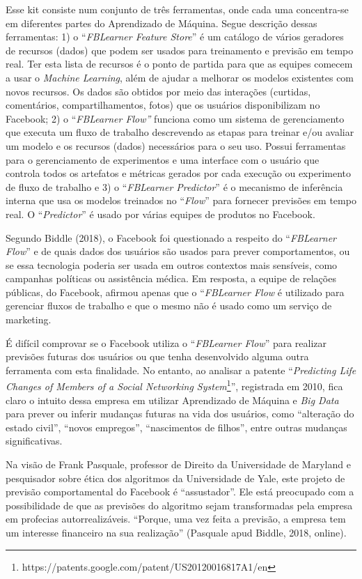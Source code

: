 Esse kit consiste num conjunto de três ferramentas, onde cada uma
concentra-se em diferentes partes do Aprendizado de Máquina. Segue
descrição dessas ferramentas: 1) o ``\emph{FBLearner Feature Store}'' é
um catálogo de vários geradores de recursos (dados) que podem ser usados
para treinamento e previsão em tempo real. Ter esta lista de recursos é
o ponto de partida para que as equipes comecem a usar o \emph{Machine
Learning}, além de ajudar a melhorar os modelos existentes com novos
recursos. Os dados são obtidos por meio das interações (curtidas,
comentários, compartilhamentos, fotos) que os usuários disponibilizam no
Facebook; 2) o ``\emph{FBLearner Flow''} funciona como um sistema de
gerenciamento que executa um fluxo de trabalho descrevendo as etapas
para treinar e/ou avaliar um modelo e os recursos (dados) necessários
para o seu uso. Possui ferramentas para o gerenciamento de experimentos
e uma interface com o usuário que controla todos os artefatos e métricas
gerados por cada execução ou experimento de fluxo de trabalho e 3) o
``\emph{FBLearner Predictor}'' é o mecanismo de inferência interna que
usa os modelos treinados no ``\emph{Flow}'' para fornecer previsões em
tempo real. O ``\emph{Predictor}'' é usado por várias equipes de
produtos no Facebook.

Segundo Biddle (2018), o Facebook foi questionado a respeito do
``\emph{FBLearner Flow}'' e de quais dados dos usuários são usados para
prever comportamentos, ou se essa tecnologia poderia ser usada em outros
contextos mais sensíveis, como campanhas políticas ou assistência
médica. Em resposta, a equipe de relações públicas, do Facebook, afirmou
apenas que o ``\emph{FBLearner Flow} é utilizado para gerenciar fluxos
de trabalho e que o mesmo não é usado como um serviço de marketing.

É difícil comprovar se o Facebook utiliza o ``\emph{FBLearner Flow}''
para realizar previsões futuras dos usuários ou que tenha desenvolvido
alguma outra ferramenta com esta finalidade. No entanto, ao analisar a
patente ``\emph{Predicting Life Changes of Members of a Social
Networking System}\footnote{https://patents.google.com/patent/US20120016817A1/en}'',
registrada em 2010, fica claro o intuito dessa empresa em utilizar
Aprendizado de Máquina e \emph{Big Data} para prever ou inferir mudanças
futuras na vida dos usuários, como ``alteração do estado civil'',
``novos empregos'', ``nascimentos de filhos'', entre outras mudanças
significativas.

Na visão de Frank Pasquale, professor de Direito da Universidade de
Maryland e pesquisador sobre ética dos algoritmos da Universidade de
Yale, este projeto de previsão comportamental do Facebook é
``assustador''. Ele está preocupado com a possibilidade de que as
previsões do algoritmo sejam transformadas pela empresa em profecias
autorrealizáveis. ``Porque, uma vez feita a previsão, a empresa tem um
interesse financeiro na sua realização'' (Pasquale apud Biddle, 2018,
online).

